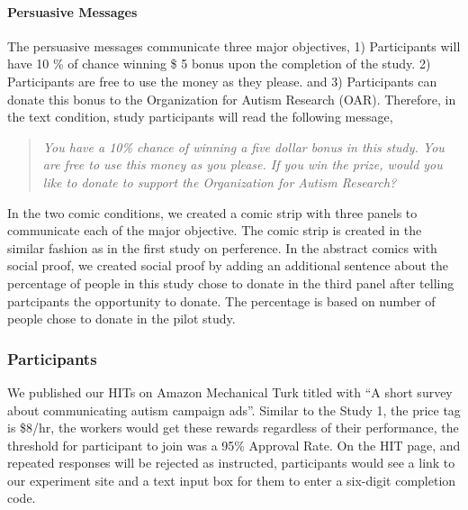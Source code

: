 \paragraph{Persuasive Messages}

The persuasive messages communicate three major objectives, 1) Participants will have 10 \% of chance winning \$ 5 bonus upon the completion of the study. 2) Participants are free to use the money as they please. and 3) Participants can donate this bonus to the Organization for Autism Research (OAR). Therefore, in the text condition, study participants will read the following message,
\begin{quote}
  \textit{You have a 10\% chance of winning a five dollar bonus in this study. You are free to use this money as you please. If you win the prize, would you like to donate to support the Organization for Autism Research?}
\end{quote}
In the two comic conditions, we created a comic strip with three panels to communicate each of the major objective. The comic strip is created in the similar fashion as in the first study on perference. In the abstract comics with social proof, we created social proof by adding an additional sentence about the percentage of people in this study chose to donate in the third panel after telling partcipants the opportunity to donate. The percentage is based on number of people chose to donate in the pilot study.


\subsubsection{Participants}
We published our HITs on Amazon Mechanical Turk titled with ``A short survey about communicating autism campaign ads''. Similar to the Study 1, the price tag is \$8/hr, the workers would get these rewards regardless of their performance, the threshold for participant to join was a 95\% Approval Rate. On the HIT page, and repeated responses will be rejected as instructed, participants would see a link to our experiment site and a text input box for them to enter a six-digit completion code.
